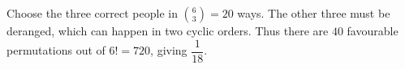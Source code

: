 Choose the three correct people in $\binom63=20$ ways. The other three must be deranged, which can happen in two cyclic orders. Thus there are $40$ favourable permutations out of $6!=720$, giving $\boxed{\dfrac{1}{18}}$.
